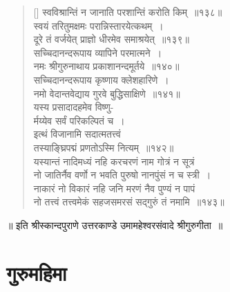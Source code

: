 \documentclass[twoside,12pt,notitlepage]{book}
\begin{document}
\begin{verse}[\versewidth]
स्वविश्रान्तिं न जानाति परशान्तिं करोति किम्~॥१३८॥\\
स्वयं तरितुमक्षमः परान्निस्तारयेत्कथम्~।\\[-6pt]
दूरे तं वर्जयेत् प्राज्ञो धीरमेव समाश्रयेत्~॥१३९॥\\
सच्चिदानन्दरूपाय व्यापिने परमात्मने~।\\[-6pt]
नमः श्रीगुरुनाथाय प्रकाशानन्दमूर्तये~॥१४०॥\\
सच्चिदानन्दरूपाय कृष्णाय क्लेशहारिणे~।\\[-6pt]
नमो वेदान्तवेद्याय गुरवे बुद्धिसाक्षिणे~॥१४१॥\\
यस्य प्रसादादहमेव विष्णु-\\[-6pt] र्मय्येव सर्वं परिकल्पितं च~।\\[-6pt]
इत्थं विजानामि सदात्मतत्त्वं\\[-6pt] तस्याङ्घ्रिपद्मं प्रणतोऽस्मि नित्यम्~॥१४२॥\\
यस्यान्तं नादिमध्यं नहि करचरणं नाम गोत्रं न सूत्रं\\[-6pt]
नो जातिर्नैव वर्णो न भवति पुरुषो नानपुंसं न च स्त्री~।\\[-6pt]
नाकारं नो विकारं नहि जनि मरणं नैव पुण्यं न पापं\\[-6pt]
नो तत्त्वं तत्त्वमेकं सहजसमरसं सद्गुरुं तं नमामि~॥१४३॥
\end{verse}
\hfil {\small ॥ इति श्रीस्कान्दपुराणे उत्तरकाण्डे उमामहेश्वरसंवादे श्रीगुरुगीता~॥}

\section{गुरुमहिमा}
\end{document}
